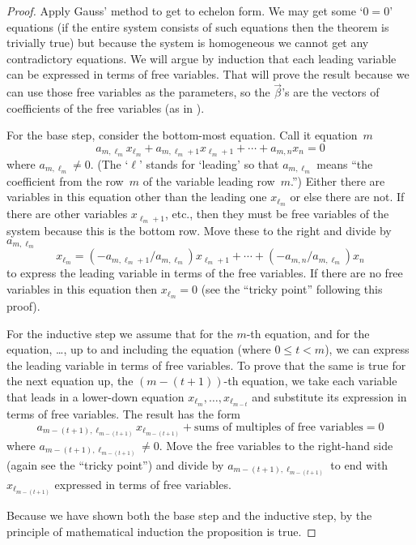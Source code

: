 \begin{proof}
Apply Gauss' method to get to echelon form.
We may get some `\( 0=0 \)' equations 
(if the entire
system consists of such equations then the theorem is trivially true)
but
because the system is homogeneous we cannot get any contradictory equations.
We will argue by induction 
that each leading variable can be expressed in terms of
free variables.
That will prove the result because 
we can use those free variables as the parameters,
so the $\vec{\beta}$'s are the vectors of coefficients of the
free variables 
(as in ). 

For the base step, consider the bottom-most
equation.
Call it equation~$m$
\begin{equation*}
  a_{m,\ell_m}x_{\ell_m}+a_{m,\ell_m+1}x_{\ell_m+1}+\cdots+a_{m,n}x_n=0
\end{equation*}
where \( a_{m,\ell_m}\neq 0 \).
(The `$\ell$' stands for `leading' 
so that $a_{m,\ell_m}$ means ``the coefficient
from the row~$m$ of the variable leading row~$m$.'')
Either there are variables in this equation other than the leading one
$x_{\ell_m}$ or else there are not.
If there are other variables $x_{\ell_{m}+1}$, etc., then they must be
free variables of the system because this is the bottom row. 
Move these to the right and divide by $a_{m,\ell_m}$
\begin{equation*}
  x_{\ell_m}
  =(-a_{m,\ell_m+1}/a_{m,\ell_m})x_{\ell_m+1}+\cdots+(-a_{m,n}/a_{m,\ell_m})x_n
\end{equation*}
to express the leading variable in terms of the free variables.
If there are no free variables in this equation 
then \( x_{\ell_m}=0 \) (see the
``tricky point'' following this proof).

For the inductive step we assume
that for the \( m \)-th equation,
and for the 
equation, \ldots, up to and including the  equation
(where \( 0\leq t<m \)), 
we can
express the leading variable in terms of free variables.
To prove that the same is true for the next equation up, 
the \( (m-(t+1)) \)-th equation, we take each variable that leads
in a lower-down equation \( x_{\ell_m},\ldots,x_{\ell_{m-t}} \) and substitute
its expression in terms of free variables.
The result has the form
\begin{equation*}
  a_{m-(t+1),\ell_{m-(t+1)}}x_{\ell_{m-(t+1)}}+
    \text{sums of multiples of free variables}=0
\end{equation*}
where \( a_{m-(t+1),\ell_{m-(t+1)}}\neq 0 \).
Move the free variables to
the right-hand side (again see the ``tricky point'') and divide by
\( a_{m-(t+1),\ell_{m-(t+1)}} \) to end with
\( x_{\ell_{m-(t+1)}} \) expressed in terms of free variables.

Because we have shown both the base step and the inductive step, by the
principle of mathematical induction the proposition is true.
\end{proof}

